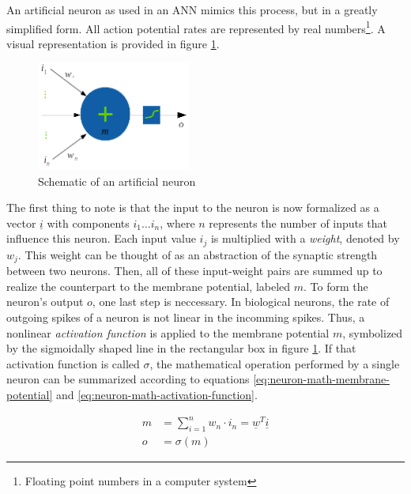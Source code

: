 \documentclass[11pt, a4paper]{article}
\newcommand\braces[1]{\left(#1\right)}
\renewcommand{\vec}[1]{\underline{#1}}
\begin{document}
An artificial neuron as used in an ANN mimics this process, but in a greatly simplified form. All action potential rates are represented by real numbers\footnote{Floating point numbers in a computer system}. A visual representation is provided in figure \ref{fig:artificial-neuron-schematic}.


\begin{figure}[htp]
	\centering
	\includegraphics[width=0.45\textwidth]{images/artificial_neuron.png}
	\caption{Schematic of an artificial neuron}
	\label{fig:artificial-neuron-schematic}
\end{figure}

The first thing to note is that the input to the neuron is now formalized as a vector $\vec{i}$ with components $i_1 \dots i_n$, where $n$ represents the number of inputs that influence this neuron. Each input value $i_j$ is multiplied with a \emph{weight}, denoted by $w_j$. This weight can be thought of as an abstraction of the synaptic strength between two neurons. Then, all of these input-weight pairs are summed up to realize the counterpart to the membrane potential, labeled $m$. To form the neuron's output $o$, one last step is neccessary. In biological neurons, the rate of outgoing spikes of a neuron is not linear in the incomming spikes. Thus, a nonlinear \emph{activation function} is applied to the membrane potential $m$, symbolized by the sigmoidally shaped line in the rectangular box in figure \ref{fig:artificial-neuron-schematic}. If that activation function is called $\sigma$, the mathematical operation performed by a single neuron can be summarized according to equations \eqref{eq:neuron-math-membrane-potential} and \eqref{eq:neuron-math-activation-function}.

\begin{align}
	m &= \sum_{i=1}^n w_n \cdot i_n = \vec{w}^T \vec{i} \label{eq:neuron-math-membrane-potential} \\
	o &= \sigma \braces{m} \label{eq:neuron-math-activation-function}
\end{align}
\end{document}
